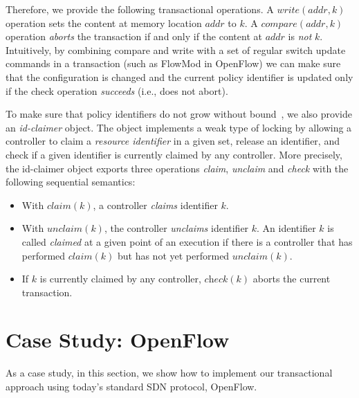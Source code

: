 \documentclass[conference]{sigcomm-alternate}
\newcommand{\Nat}{\mathbb{N}}
\newcommand{\claimcheck}{check\xspace}
\newcommand{\compare}{compare\xspace}
\newcommand{\addr}{\textit{addr}\xspace}
\newcommand{\liron}[1]{\textit{\textcolor{mygreen}{[liron]: #1}}} %
\newcommand{\petr}[1]{\textit{\textcolor{blue}{[petr]: #1}}} %
\begin{document}
Therefore, we provide the following transactional operations.
A $\textit{write}(\addr,k)$ operation sets the content at memory location
$\addr$ to $k$.
A $\textit{\compare}(\addr,k)$ operation \emph{aborts} the transaction
if and only if the content at
$\addr$ is \emph{not} $k$.
Intuitively, by combining compare and write with a set of regular
switch update commands 
in a transaction (such as FlowMod in OpenFlow)  we can make sure that the
configuration is changed and the current policy identifier is updated
only if the check operation \emph{succeeds} (i.e., does not abort).

To make sure that policy identifiers do not grow without bound~\cite{stn}, we
also provide an \emph{id-claimer} object.
The object implements a weak type
of locking by allowing a controller to claim a \emph{resource identifier} in a
given set, release an identifier,  and check if a given identifier
is currently claimed by any controller.
More precisely, the id-claimer object exports three operations \emph{claim},
\emph{unclaim} and \emph{\claimcheck} with the following sequential
semantics:

\begin{itemize}
\item With $\textit{claim}(k)$,
a controller %
\emph{claims}  identifier $k$.

\item With $\textit{unclaim}(k)$, %
the controller %
  \emph{unclaims} identifier $k$.
An identifier $k$ is called \emph{claimed} at a given point of an
execution if there is a controller that has performed $\textit{claim}(k)$
but has not yet performed  $\textit{unclaim}(k)$.

\item If $k$ is currently claimed by any controller,
$\textit{\claimcheck}(k)$ %
aborts the current transaction.

\end{itemize}



\section{Case Study: OpenFlow}\label{sec:background}

As a case study, in this section, we show how to implement
our transactional approach using today's standard SDN protocol,
 OpenFlow. 
\end{document}
